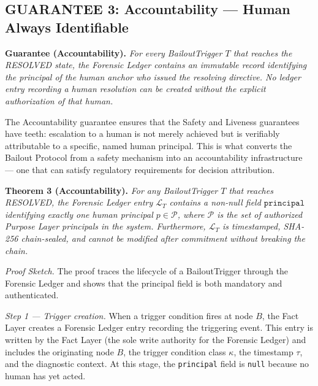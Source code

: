 \subsection{GUARANTEE 3: Accountability — Human Always Identifiable}
\label{sec:guarantee-accountability}

\bigskip

\begin{minipage}{\tmpdimb}
\textbf{Guarantee (Accountability).} \textit{For every BailoutTrigger $T$ that reaches the RESOLVED state, the Forensic Ledger contains an immutable record identifying the principal of the human anchor who issued the resolving directive. No ledger entry recording a human resolution can be created without the explicit authorization of that human.}
\end{minipage}

\bigskip

The Accountability guarantee ensures that the Safety and Liveness guarantees have teeth: escalation to a human is not merely achieved but is verifiably attributable to a specific, named human principal. This is what converts the Bailout Protocol from a safety mechanism into an accountability infrastructure — one that can satisfy regulatory requirements for decision attribution.

\bigskip

\noindent\textbf{Theorem 3 (Accountability).}
\textit{For any BailoutTrigger $T$ that reaches RESOLVED, the Forensic Ledger entry $\mathcal{L}_T$ contains a non-null field $\texttt{principal}$ identifying exactly one human principal $p \in \mathcal{P}$, where $\mathcal{P}$ is the set of authorized Purpose Layer principals in the system. Furthermore, $\mathcal{L}_T$ is timestamped, SHA-256 chain-sealed, and cannot be modified after commitment without breaking the chain.}

\bigskip

\noindent\textit{Proof Sketch.} The proof traces the lifecycle of a BailoutTrigger through the Forensic Ledger and shows that the principal field is both mandatory and authenticated.

\medskip

\noindent\textit{Step 1 — Trigger creation.} When a trigger condition fires at node $B$, the Fact Layer creates a Forensic Ledger entry recording the triggering event. This entry is written by the Fact Layer (the sole write authority for the Forensic Ledger) and includes the originating node $B$, the trigger condition class $\kappa$, the timestamp $\tau$, and the diagnostic context. At this stage, the \texttt{principal} field is \texttt{null} because no human has yet acted.


